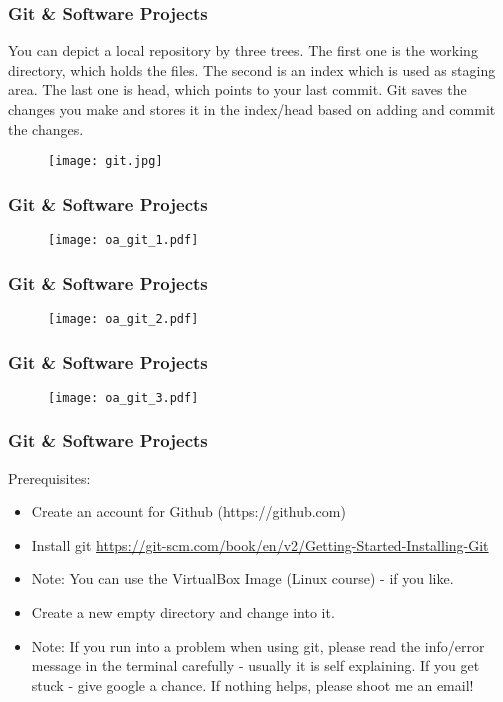 \documentclass{beamer} %
\begin{document}
\begin{frame}[t]
\frametitle{Git \& Software Projects}
You can depict a local repository by three trees. The first one is the working directory, which holds the files. The second is an index which is used as staging area. The last one is head, which points to your last commit. Git saves the changes you make and stores it in the index/head based on adding and commit the changes.
\begin{figure}
    \begin{center}
    	\texttt{[image: git.jpg]}
    \end{center}
\end{figure}
\end{frame}

\begin{frame}[t]
\frametitle{Git \& Software Projects}

\begin{figure}
    \begin{center}
    	\texttt{[image: oa\_git\_1.pdf]}
    \end{center}
\end{figure}
\end{frame}

\begin{frame}[t]
\frametitle{Git \& Software Projects}
\begin{figure}
    \begin{center}
    	\texttt{[image: oa\_git\_2.pdf]}
    \end{center}
\end{figure}
\end{frame}

\begin{frame}[t]
\frametitle{Git \& Software Projects}

\begin{figure}
    \begin{center}
    	\texttt{[image: oa\_git\_3.pdf]}
    \end{center}
\end{figure}
\end{frame}

\begin{frame}[t]
\frametitle{Git \& Software Projects}
Prerequisites:
\begin{itemize}
\item Create an account for Github (https://github.com)
\item Install git \url{https://git-scm.com/book/en/v2/Getting-Started-Installing-Git}
\item Note: You can use the VirtualBox Image (Linux course) - if you like. 
\item Create a new empty directory and change into it.
\item Note: If you run into a problem when using git, please read the info/error message in the terminal carefully - usually it is self explaining. If you get stuck - give google a chance. If nothing helps, please shoot me an email! 
\end{itemize}
\end{frame}
\end{document}
